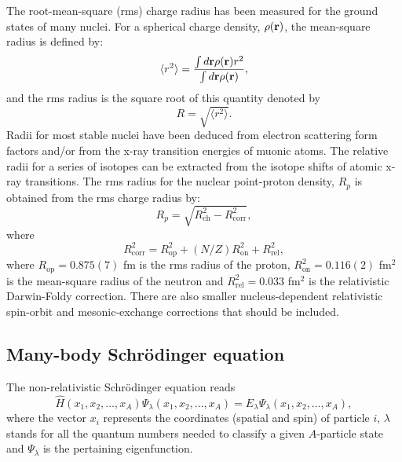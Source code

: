 \begin{itemize}
The root-mean-square (rms) charge radius has been measured for the ground states of many
nuclei. For a spherical charge density, $\rho({\bf r})$, the mean-square radius is defined by:
\[
\langle r^2\rangle = \frac{ \int  d {\bf r} \rho({\bf r}) r^2}{ \int  d {\bf r} \rho({\bf r})},
\]
and the rms radius is the square root of this quantity denoted by
\[
R =\sqrt{ \langle r^2\rangle}.
\]
Radii for most stable
nuclei have been deduced from electron scattering form
factors and/or from the x-ray transition energies of muonic atoms. 
The relative radii for a
series of isotopes can be extracted from the isotope shifts of atomic x-ray transitions.
The rms radius for the nuclear point-proton density, $R_p$ is obtained from the rms charge radius by:
\[
R_p = \sqrt{R^2_{\mathrm{ch}}- R^2_{\mathrm{corr}}},
\]
where
\[
R^2_{\mathrm{corr}}= R^2_{\mathrm{op}}+(N/Z)R^2_{\mathrm{on}}+R^2_{\mathrm{rel}},
\]
where $ R_{\mathrm{op}}= 0.875(7)$ fm  is the rms radius of the proton, $R^2_{\mathrm{on}} = 0.116(2)$ fm$^2$ is the
mean-square radius of the neutron and $R^2_{\mathrm{rel}} = 0.033$ fm$^2$ is the relativistic Darwin-Foldy correction. There are also smaller nucleus-dependent relativistic spin-orbit and
mesonic-exchange corrections that should be included.





\subsection{Many-body Schr\"odinger equation}



The non-relativistic Schr\"odinger equation reads 
\begin{equation}
\hat{H}(x_1, x_2, \hdots , x_A) \Psi_{\lambda}(x_1, x_2, \dots , x_A) = 
E_\lambda  \Psi_\lambda(x_1, x_2, \hdots , x_A), 
\label{eq:basicSE1}
\end{equation}
where the vector $x_i$ represents the coordinates (spatial and spin) of particle $i$, $\lambda$ stands  for all the quantum
numbers needed to classify a given $A$-particle state and $\Psi_{\lambda}$ is the pertaining eigenfunction.  


\end{itemize}

